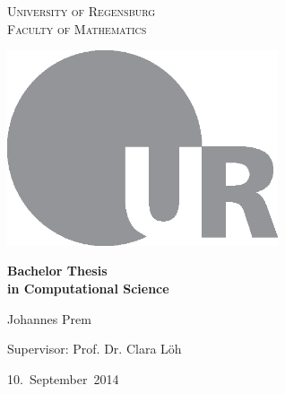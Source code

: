 \begin{titlepage}
    \begin{center}
    \scshape
        University of Regensburg\\
        Faculty of Mathematics
        
    \vspace{2cm}
    
        
    \vspace{2.5cm}
    
        \includegraphics[width=0.6\textwidth]{ur_logo.eps}
        
    \vspace{2cm}
    
        {\Large\bfseries%
            Bachelor Thesis\\
            in Computational Science}
        
    \vspace{1.3cm}
    
        Johannes Prem
        
    \vspace{0.4cm}
    
        Supervisor: Prof. Dr. Clara Löh
        
    \vfill
    
        10.~September~2014
    \end{center}
\end{titlepage}
